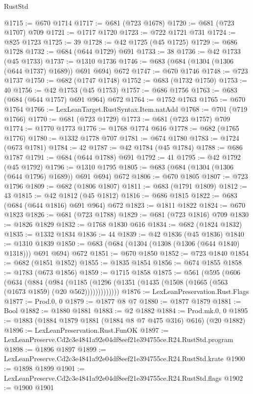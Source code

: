 \begin{lexlean}{RustStd}
\begin{coremodule}
@1715 := @670 @1714
@1717 := @681 (@723 @1678)
@1720 := @681 (@723 @1707) @709
@1721 := @1717 @1720
@1723 := @722 @1721 @731
@1724 := @825 @1723
@1725 := 39
@1728 := @42 @1725 (@45 @1725)
@1729 := @686 @1728
@1732 := @684 (@644 @1729) @691
@1733 := 38
@1736 := @42 @1733 (@45 @1733)
@1737 := @1310 @1736
@1746 := @683 (@684 (@1304 (@1306 (@644 @1737) @1689)) @691 @694) @672
@1747 := @670 @1746
@1748 := @723 @1737
@1750 := @682 (@1747 @1748)
@1752 := @683 (@1732 @1750)
@1753 := 40
@1756 := @42 @1753 (@45 @1753)
@1757 := @686 @1756
@1763 := @683 (@684 (@644 @1757) @691 @964) @672
@1764 := @1752 @1763
@1765 := @670 @1764
@1766 := LexLeanTarget.RustSyntax.Item.natAdd
@1768 := @701 (@719 @1766)
@1770 := @681 (@723 @1729)
@1773 := @681 (@723 @1757) @709
@1774 := @1770 @1773
@1776 := @1768 @1774 @616
@1778 := @682 (@1765 @1776)
@1780 := @1332 @1778 @707
@1781 := @674 @1780
@1783 := @1724 (@673 @1781)
@1784 := 42
@1787 := @42 @1784 (@45 @1784)
@1788 := @686 @1787
@1791 := @684 (@644 @1788) @691
@1792 := 41
@1795 := @42 @1792 (@45 @1792)
@1796 := @1310 @1795
@1805 := @683 (@684 (@1304 (@1306 (@644 @1796) @1689)) @691 @694) @672
@1806 := @670 @1805
@1807 := @723 @1796
@1809 := @682 (@1806 @1807)
@1811 := @683 (@1791 @1809)
@1812 := 43
@1815 := @42 @1812 (@45 @1812)
@1816 := @686 @1815
@1822 := @683 (@684 (@644 @1816) @691 @964) @672
@1823 := @1811 @1822
@1824 := @670 @1823
@1826 := @681 (@723 @1788)
@1829 := @681 (@723 @1816) @709
@1830 := @1826 @1829
@1832 := @1768 @1830 @616
@1834 := @682 (@1824 @1832)
@1835 := @1332 @1834
@1836 := 44
@1839 := @42 @1836 (@45 @1836)
@1840 := @1310 @1839
@1850 := @683 (@684 (@1304 (@1308 (@1306 (@644 @1840) @1318))) @691 @694) @672
@1851 := @670 @1850
@1852 := @723 @1840
@1854 := @682 (@1851 @1852)
@1855 := @1835 @1854
@1856 := @674 @1855
@1858 := @1783 (@673 @1856)
@1859 := @1715 @1858
@1875 := @561
    (@595
      (@606
        (@634
          (@884
            (@984
              (@1185 (@1296 (@1351 (@1435 (@1508 (@1665 (@563 (@1673 @1859) (@20 @562)))))))))))))
@1876 := LexLeanPreservation.Rust.Flags
@1877 := Prod.{0, 0}
@1879 := @1877 @8 @7
@1880 := @1877 @1879
@1881 := Bool
@1882 := @1880 @1881
@1883 := @2 @1882
@1884 := Prod.mk.{0, 0}
@1895 := @1883 (@1884 @1879 @1881 (@1884 @8 @7 @475 @316) @616) (@20 @1882)
@1896 := LexLeanPreservation.Rust.FunOK
@1897 := LexLeanPreserve.Cd2c3e4841a92e04df8eef21e394755ce.R24.RustStd.program
@1898 := @1896 @1897
@1899 := LexLeanPreserve.Cd2c3e4841a92e04df8eef21e394755ce.R24.RustStd.krate
@1900 := @1898 @1899
@1901 := LexLeanPreserve.Cd2c3e4841a92e04df8eef21e394755ce.R24.RustStd.flags
@1902 := @1900 @1901

\end{coremodule}
\end{lexlean}
